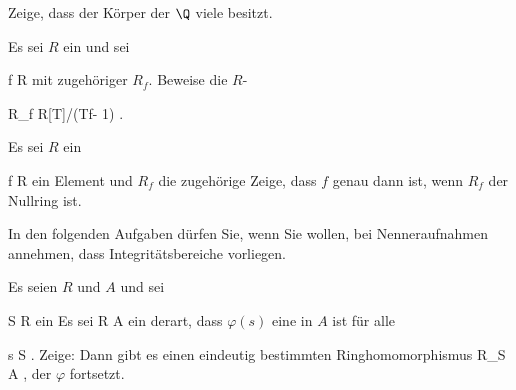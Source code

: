 {}
{





Zeige, dass der Körper der
$\Q$
viele
besitzt.





}
{} {}

{}
{





Es sei $R$ ein
und sei

\mavergleichskette
{\vergleichskette
{ f
}
{ \in }{ R
}
{  }{
}
{    }{
}
{   }{
}
}
{}{}{}
mit zugehöriger
$R_f$. Beweise die
$R$-

\mavergleichskettedisp
{\vergleichskette
{R_f
}
{ \cong} { R[T]/(Tf- 1)
}
{ } {
}
{ } {
}
{ } {
}
}
{}{}{.}





}
{} {}

{}
{





Es sei $R$ ein

\mavergleichskette
{\vergleichskette
{ f
}
{ \in }{ R
}
{  }{
}
{    }{
}
{   }{
}
}
{}{}{}
ein Element und $R_f$ die zugehörige
Zeige, dass $f$ genau dann
ist, wenn $R_f$ der Nullring ist.





}
{} {}

In den folgenden Aufgaben dürfen Sie, wenn Sie wollen, bei Nenneraufnahmen annehmen, dass Integritätsbereiche vorliegen.

{}
{





Es seien $R$ und $A$
und sei

\mavergleichskette
{\vergleichskette
{ S
}
{ \subseteq }{ R
}
{  }{
}
{    }{
}
{   }{
}
}
{}{}{}
ein
Es sei
\maabbdisp {\varphi} { R } { A
} {}
ein
derart, dass $\varphi(s)$ eine
in $A$ ist für alle

\mavergleichskette
{\vergleichskette
{ s
}
{ \in }{ S
}
{  }{
}
{    }{
}
{   }{
}
}
{}{}{.}
Zeige: Dann gibt es einen eindeutig bestimmten Ringhomomorphismus
\maabbdisp {\tilde{\varphi}} { R_S } { A
} {,}
der $\varphi$ fortsetzt.





}
{} {}

